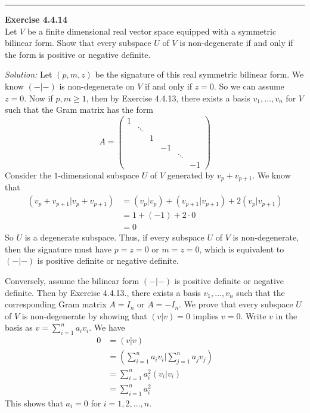 \documentclass[a4paper, 12pt]{article}
\newenvironment{problem}[2][Exercise]
    { \begin{mdframed}[backgroundcolor=gray!20] \textbf{#1 #2} \\}
    {  \end{mdframed}}
\newenvironment{solution}
    {\textit{Solution:}}
    {}
\begin{document}
\noindent\rule{7in}{2.8pt}
\begin{problem}{4.4.14}
Let \(V\) be a finite dimensional real vector space equipped with a symmetric bilinear form. Show that every subspace \(U\) of \(V\) is non-degenerate if and only if 
the form is positive or negative definite.
\end{problem}
\begin{solution}
Let \((p,m,z)\) be the signature of this real symmetric bilinear form. We know \((-|-)\) is non-degenerate on \(V\) if and only if \(z=0\). So we can assume \(z=0\). Now if \(p,m\geq 1\), then by Exercise 4.4.13, there exists a basis 
\(v_1,\ldots,v_n\) for \(V\) such that the Gram matrix has the form  
\[A=\begin{pmatrix}
	1 & & & & &\\
	  &\ddots & & & &\\ 
	  &  & 1 & & &\\ 
      & & & -1 & &\\ 
	  & & & &\ddots & \\ 
	  & & & & & -1
\end{pmatrix}\]
Consider the \(1\)-dimensional subspace \(U\) of \(V\) generated by \(v_p+v_{p+1}\). We know that 
\begin{align*}
	(v_p+v_{p+1}|v_p+v_{p+1}) & =(v_p|v_p)+(v_{p+1}|v_{p+1})+2(v_p|v_{p+1})\\ 
	                          & =1+(-1)+2\cdot 0\\ 
							  & =0
\end{align*}
So \(U\) is a degenerate subspace. Thus, if every subspace \(U\) of \(V\) is non-degenerate, then the signature must have \(p=z=0\) or \(m=z=0\), which is equivalent to \((-|-)\) is positive definite or negative definite. 
\par 
Conversely, assume the bilinear form \((-|-)\) is positive definite or negative definite. Then by Exercise 4.4.13., there exists a basis \(v_1,\ldots,v_n\) such that the corresponding Gram matrix \(A=I_n\) or \(A=-I_n\). We prove that every subspace \(U\) 
of \(V\) is non-degenerate by showing that \((v|v)=0\) implies \(v=0\). Write \(v\) in the basis as \(v=\sum_{i=1}^{n}a_iv_i\). We have 
\begin{align*}
	0 & =(v|v)\\ 
	  & =(\sum_{i=1}^{n}a_iv_i|\sum_{j=1}^{n}a_jv_j)\\ 
	  & =\sum_{i=1}^{n}a_i^2(v_i|v_i)\\ 
	  & =\sum_{i=1}^{n}a_i^2
\end{align*}
This shows that \(a_i=0\) for \(i=1,2,\ldots,n\).
\end{solution}
\end{document}
